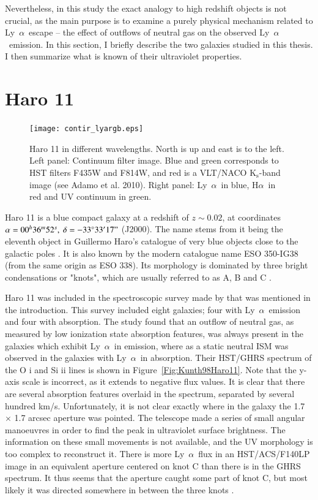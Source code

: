 \documentclass[a4wide,12pt]{book}
\newcommand{\ha}{H${\alpha}$}
\newcommand{\lya}{Ly~${\alpha}$}
\begin{document}
{Nevertheless, in this study the exact analogy to high redshift objects is not crucial, as the main purpose is to examine a purely physical mechanism related to \lya\ escape -- the effect of outflows of neutral gas on the observed \lya\ emission. In this section, I briefly describe the two galaxies studied in this thesis. I then summarize what is known of their ultraviolet properties. 

\section{Haro 11}

\begin{figure}
   \centering
   \texttt{[image: contir\_lyargb.eps]}
   \caption{Haro 11 in different wavelengths. North is up and east is to the left. Left panel: Continuum filter image. Blue and green corresponds to HST filters F435W and F814W, and red is a VLT/NACO $\mathrm{K_s}$-band image (see Adamo et al. 2010). Right panel: \lya\ in blue, \ha\ in red and UV continuum in green.}
              \label{Fig:Haro11_colour}
    \end{figure}

Haro 11 is a blue compact galaxy at a redshift of $z\sim0.02$, at coordinates $\alpha = 00^h 36^m 52^s,~\delta = -33^\circ 33' 17"$ (J2000). The name stems from it being the eleventh object in Guillermo Haro's catalogue of very blue objects close to the galactic poles \citep{haro1956}. It is also known by the modern catalogue name ESO 350-IG38 (from the same origin as ESO 338). Its morphology is dominated by three bright condensations or "knots", which are usually referred to as A, B and C \citep[as can be found in a footnote to Table 1 in][see also Figure~\ref{Fig:Slits} and Figure~\ref{Fig:Haro11_colour}]{vader-1993}. 

Haro 11 was included in the spectroscopic survey made by \citet{kunth-1998} that was mentioned in the introduction. This survey included eight galaxies; four with \lya\ emission and four with absorption. The study found that an outflow of neutral gas, as measured by low ionization state absorption features, was always present in the galaxies which exhibit \lya\ in emission, where as a static neutral ISM was observed in the galaxies with \lya\ in absorption. Their HST/GHRS spectrum of the O {\sc i} and Si {\sc ii} lines is shown in Figure~\ref{Fig:Kunth98Haro11}. Note that the y-axis scale is incorrect, as it extends to negative flux values. It is clear that there are several absorption features overlaid in the spectrum, separated by several hundred km/s. Unfortunately, it is not clear exactly where in the galaxy the 1.7 $\times$ 1.7 arcsec aperture was pointed. The telescope made a series of small angular manoeuvres in order to find the peak in ultraviolet surface brightness. The information on these small movements is not available, and the UV morphology is too complex to reconstruct it. There is more \lya\ flux in an HST/ACS/F140LP image in an equivalent aperture centered on knot C than there is in the GHRS spectrum. It thus seems that the aperture caught some part of knot C, but most likely it was directed somewhere in between the three knots \citep[see discussion in][]{hayes-2007}. 

}
\end{document}
